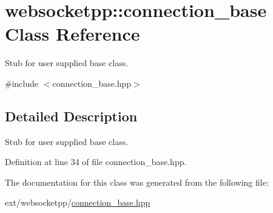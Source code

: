 \hypertarget{classwebsocketpp_1_1connection__base}{}\section{websocketpp\+:\+:connection\+\_\+base Class Reference}
\label{classwebsocketpp_1_1connection__base}


Stub for user supplied base class.  




{\ttfamily \#include $<$connection\+\_\+base.\+hpp$>$}



\subsection{Detailed Description}
Stub for user supplied base class. 

Definition at line 34 of file connection\+\_\+base.\+hpp.



The documentation for this class was generated from the following file\+:\begin{DoxyCompactItemize}
\item 
ext/websocketpp/\hyperlink{connection__base_8hpp}{connection\+\_\+base.\+hpp}\end{DoxyCompactItemize}
